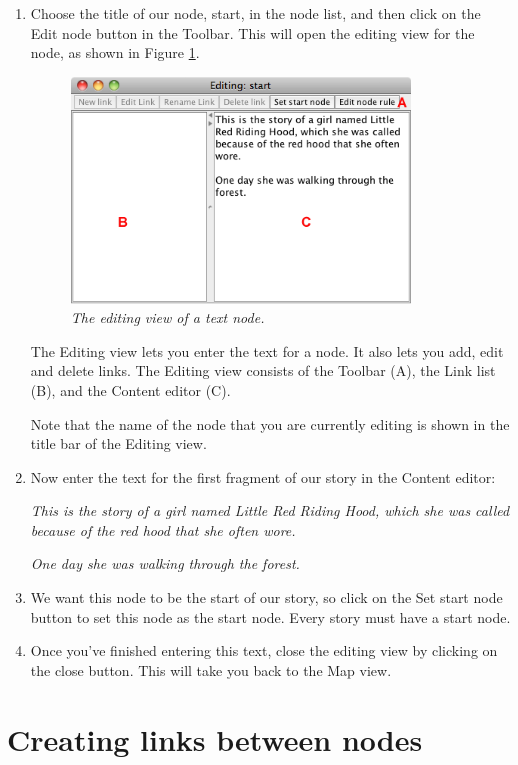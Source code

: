 \documentclass{article}
\begin{document}
\begin{enumerate}
  \item Choose the title of our node, start, in the node list, and then click
  on the Edit node button in the Toolbar. This will open the editing view for
  the node, as shown in Figure \ref{fig:edit_node}. 
  
\begin{figure}[ht]
  \centering
  \includegraphics[width=9cm]{images/hypedyn-tutorial-1-figure-5}
  \caption{\textit{The editing view of a text node.}}
  \label{fig:edit_node}
\end{figure} 

The Editing view lets you enter the text for a node. It also lets you add, edit
and delete links. The Editing view consists of the Toolbar (A), the Link list (B),
and the Content editor (C).

Note that the name of the node that you are currently editing is shown in the
title bar of the Editing view.

\item Now enter the text for the first fragment of our story in the Content
editor:

\textit{This is the story of a girl named Little Red Riding Hood, which she was
called because of the red hood that she often wore.}

\textit{One day she was walking through the forest.}

\item We want this node to be the start of our story, so click on the Set start
node button to set this node as the start node. Every story must have a start node.
\item Once you've finished entering this text, close the editing view by
clicking on the close button. This will take you back to the Map view.
\end{enumerate}

\section{Creating links between nodes}
\end{document}
